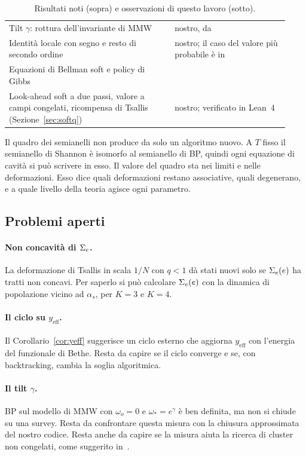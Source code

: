 \begin{table}[t]
\begin{tabular}{@{}p{0.55\linewidth}p{0.38\linewidth}@{}}
Tilt $\gamma$: rottura dell'invariante di MMW & nostro, da~\citep{maneva2007survey} \\
Identità locale con segno e resto di secondo ordine & nostro; il caso del valore più probabile è in~\citep{marino2016bsp} \\
Equazioni di Bellman soft e policy di Gibbs & \citep{haarnoja2018soft} \\
Look-ahead soft a due passi, valore a campi congelati, ricompensa di Tsallis (Sezione~\ref{sec:softq}) & nostro; verificato in Lean~4 \\
\bottomrule
\end{tabular}
\caption{Risultati noti (sopra) e osservazioni di questo lavoro (sotto).}
\label{tab:known}
\end{table}

Il quadro dei semianelli non produce da solo un algoritmo nuovo.
A $T$ fisso il semianello di Shannon è isomorfo al semianello di BP, quindi ogni equazione di cavità si può scrivere in esso.
Il valore del quadro sta nei limiti e nelle deformazioni.
Esso dice quali deformazioni restano associative, quali degenerano, e a quale livello della teoria agisce ogni parametro.

\subsection{Problemi aperti}

\paragraph{Non concavità di $\Sigma_e$.}
La deformazione di Tsallis in scala $1/N$ con $q<1$ dà stati nuovi solo se $\Sigma_e(e)$ ha tratti non concavi.
Per saperlo si può calcolare $\Sigma_e(e)$ con la dinamica di popolazione vicino ad $\alpha_s$, per $K=3$ e $K=4$.

\paragraph{Il ciclo su $y_{\mathrm{eff}}$.}
Il Corollario~\ref{cor:yeff} suggerisce un ciclo esterno che aggiorna $y_{\mathrm{eff}}$ con l'energia del funzionale di Bethe.
Resta da capire se il ciclo converge e se, con backtracking, cambia la soglia algoritmica.

\paragraph{Il tilt $\gamma$.}
BP sul modello di MMW con $\omega_o=0$ e $\omega_*=e^\gamma$ è ben definita, ma non si chiude su una survey.
Resta da confrontare questa misura con la chiusura approssimata del nostro codice.
Resta anche da capire se la misura aiuta la ricerca di cluster non congelati, come suggerito in~\citep{marino2016bsp}.

